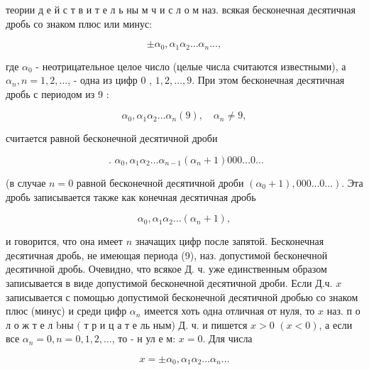 \documentclass[10pt]{article}
\begin{document}
теории д е й с т в и т е л ь ны м ч и с л о м наз. всякая бесконечная десятичная дробь со знаком плюс или минус:



\[

\pm \alpha_{0}, \alpha_{1} \alpha_{2} \ldots \alpha_{n} \ldots,

\]



где $\alpha_{0}$ - неотрицательное целое число (целые числа считаются известными), а $\alpha_{n}, n=1,2, \ldots$, - одна из цифр 0 , $1,2, \ldots, 9$. При этом бесконечная десятичная дробь с периодом из 9 :



\[

\alpha_{0}, \alpha_{1} \alpha_{2} \ldots \alpha_{n}(9), \quad \alpha_{n} \neq 9,

\]



считается равной бесконечной десятичной дроби



\[

\text { . } \alpha_{0}, \alpha_{1} \alpha_{2} \ldots \alpha_{n-1}\left(\alpha_{n}+1\right) 000 \ldots 0 \ldots

\]



(в случае $n=0$ равной бесконечной десятичной дроби $\left.\left(\alpha_{0}+1\right), 000 \ldots 0 \ldots\right)$. Эта дробь записывается также как конечная десятичная дробь



\[

\alpha_{0}, \alpha_{1} \alpha_{2} \ldots\left(\alpha_{n}+1\right),

\]



и говорится, что она имеет $n$ значащих цифр после запятой. Бесконечная десятичная дробь, не имеющая периода (9), наз. допустимой бесконечной десятичной дробь. Очевидно, что всякое Д. ч. уже единственным образом записывается в виде допустимой бесконечной десятичной дроби. Если Д.ч. $x$ записывается с помощью допустимой бесконечной десятичной дробью со знаком плюс (минус) и среди цифр $\alpha_{n}$ имеется хоть одна отличная от нуля, то $x$ наз. п о л о ж т е л bны $($ т р и ц а т е ль ным) Д. ч. и пишется $x>0$ $(x<0)$, а если все $\alpha_{n}=0, n=0,1,2, \ldots$, то - н ул е м: $x=0$. Для числа



\[

x= \pm \alpha_{0}, \alpha_{1} \alpha_{2} \ldots \alpha_{n} \ldots

\]
\end{document}
